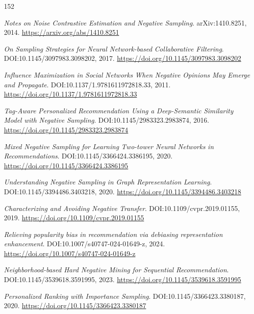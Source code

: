 \documentclass[11pt,a4paper]{article}
\begin{document}
\begin{thebibliography}{152}
\setlength{\itemsep}{2pt}

\newblock \emph{Notes on Noise Contrastive Estimation and Negative Sampling}.
\newblock arXiv:1410.8251, 2014.
\newblock \url{https://arxiv.org/abs/1410.8251}

\newblock \emph{On Sampling Strategies for Neural Network-based Collaborative Filtering}.
\newblock DOI:10.1145/3097983.3098202, 2017.
\newblock \url{https://doi.org/10.1145/3097983.3098202}

\newblock \emph{Influence Maximization in Social Networks When Negative Opinions May Emerge and Propagate}.
\newblock DOI:10.1137/1.9781611972818.33, 2011.
\newblock \url{https://doi.org/10.1137/1.9781611972818.33}

\newblock \emph{Tag-Aware Personalized Recommendation Using a Deep-Semantic Similarity Model with Negative Sampling}.
\newblock DOI:10.1145/2983323.2983874, 2016.
\newblock \url{https://doi.org/10.1145/2983323.2983874}

\newblock \emph{Mixed Negative Sampling for Learning Two-tower Neural Networks in Recommendations}.
\newblock DOI:10.1145/3366424.3386195, 2020.
\newblock \url{https://doi.org/10.1145/3366424.3386195}

\newblock \emph{Understanding Negative Sampling in Graph Representation Learning}.
\newblock DOI:10.1145/3394486.3403218, 2020.
\newblock \url{https://doi.org/10.1145/3394486.3403218}

\newblock \emph{Characterizing and Avoiding Negative Transfer}.
\newblock DOI:10.1109/cvpr.2019.01155, 2019.
\newblock \url{https://doi.org/10.1109/cvpr.2019.01155}

\newblock \emph{Relieving popularity bias in recommendation via debiasing representation enhancement}.
\newblock DOI:10.1007/s40747-024-01649-z, 2024.
\newblock \url{https://doi.org/10.1007/s40747-024-01649-z}

\newblock \emph{Neighborhood-based Hard Negative Mining for Sequential Recommendation}.
\newblock DOI:10.1145/3539618.3591995, 2023.
\newblock \url{https://doi.org/10.1145/3539618.3591995}

\newblock \emph{Personalized Ranking with Importance Sampling}.
\newblock DOI:10.1145/3366423.3380187, 2020.
\newblock \url{https://doi.org/10.1145/3366423.3380187}


\end{thebibliography}
\end{document}
